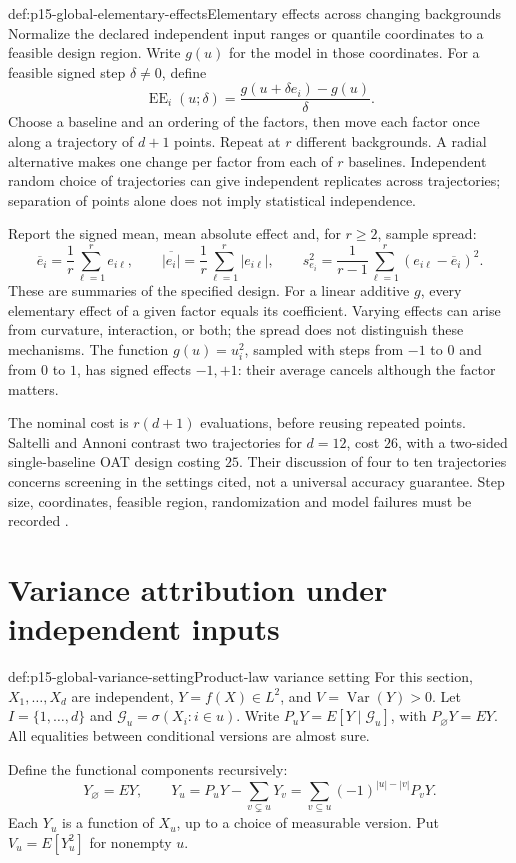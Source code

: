 \begin{hbmethod}{def:p15-global-elementary-effects}{Elementary effects across changing backgrounds}
Normalize the declared independent input ranges or quantile coordinates
to a feasible design region. Write \(g(u)\) for the model in those
coordinates. For a feasible signed step \(\delta\ne0\), define
\[
 \operatorname{EE}_i(u;\delta)
       =\frac{g(u+\delta e_i)-g(u)}{\delta}.
\]
Choose a baseline and an ordering of the factors, then move each factor
once along a trajectory of \(d+1\) points. Repeat at \(r\) different
backgrounds. A radial alternative makes one change per factor from each
of \(r\) baselines. Independent random choice of trajectories can give
independent replicates across trajectories; separation of points alone
does not imply statistical independence.

Report the signed mean, mean absolute effect and, for \(r\geq2\), sample
spread:
\[
 \overline e_i=\frac1r\sum_{\ell=1}^r e_{i\ell},\qquad
 \overline{|e_i|}=\frac1r\sum_{\ell=1}^r|e_{i\ell}|,\qquad
 s_{e_i}^2=\frac1{r-1}\sum_{\ell=1}^r(e_{i\ell}-\overline e_i)^2.
\]
These are summaries of the specified design.
For a linear additive \(g\), every elementary effect of a given factor
equals its coefficient. Varying effects can arise from curvature,
interaction, or both; the spread does not distinguish these mechanisms.
The function \(g(u)=u_i^2\), sampled with steps from \(-1\) to \(0\) and
from \(0\) to \(1\), has signed effects \(-1,+1\): their average cancels
although the factor matters.

The nominal cost is \(r(d+1)\) evaluations, before reusing repeated
points. Saltelli and Annoni contrast two trajectories for \(d=12\),
cost \(26\), with a two-sided single-baseline OAT design costing \(25\).
Their discussion of four to ten trajectories concerns screening in the
settings cited, not a universal accuracy guarantee.
Step size, coordinates, feasible region, randomization and model failures
must be recorded \cite[Sections 5.3 and 6]{SaltelliAnnoni2010Sensitivity}.
\end{hbmethod}

\section{Variance attribution under independent inputs}

\begin{hbdefinition}{def:p15-global-variance-setting}{Product-law variance setting}
For this section, \(X_1,\ldots,X_d\) are independent, \(Y=f(X)\in L^2\),
and \(V=\operatorname{Var}(Y)>0\).
Let \(I=\{1,\ldots,d\}\) and
\(\mathcal G_u=\sigma(X_i:i\in u)\).
Write \(P_uY=E[Y\mid\mathcal G_u]\), with \(P_\varnothing Y=EY\).
All equalities between conditional versions are almost sure.

Define the functional components recursively:
\[
 Y_\varnothing=EY,\qquad
 Y_u=P_uY-\sum_{v\subsetneq u}Y_v
       =\sum_{v\subseteq u}(-1)^{|u|-|v|}P_vY.
\]
Each \(Y_u\) is a function of \(X_u\), up to a choice of measurable
version. Put \(V_u=E[Y_u^2]\) for nonempty \(u\).
\end{hbdefinition}

